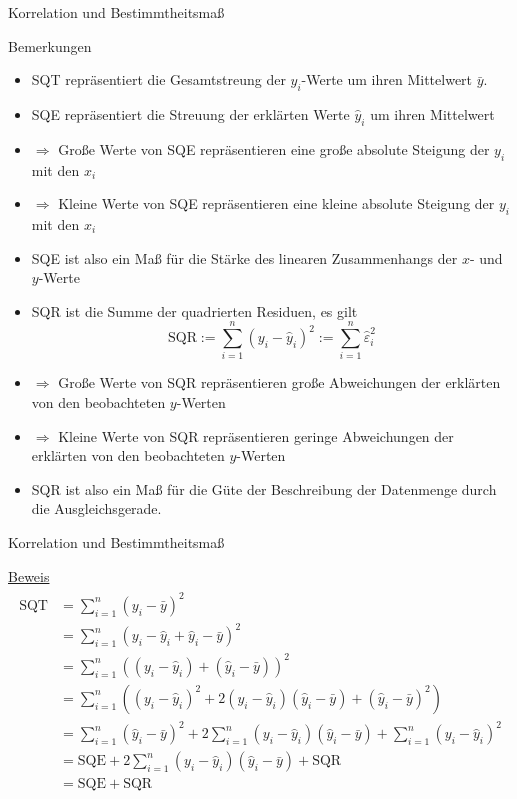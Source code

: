 \documentclass[
  8pt,
  ignorenonframetext,
]{beamer}
\begin{document}
\begin{frame}{Korrelation und Bestimmtheitsmaß}
\protect\hypertarget{korrelation-und-bestimmtheitsmauxdf-4}{}
\footnotesize
{}

Bemerkungen

\begin{itemize}
\item SQT repräsentiert die Gesamtstreung der $y_i$-Werte um ihren Mittelwert $\bar{y}$.
\item SQE repräsentiert die Streuung der erklärten Werte $\hat{y}_i$ um ihren Mittelwert
\item[] $\Rightarrow$ Große Werte von SQE repräsentieren eine große absolute Steigung der $y_i$ mit den $x_i$
\item[] $\Rightarrow$ Kleine Werte von SQE repräsentieren eine kleine absolute Steigung der $y_i$ mit den $x_i$
\item SQE ist also ein Maß für die Stärke des linearen Zusammenhangs der $x$- und $y$-Werte
\item SQR ist die Summe der quadrierten Residuen, es gilt
\begin{equation}
\mbox{SQR} := \sum_{i = 1}^n (y_i - \hat{y}_i)^2 := \sum_{i=1}^n \hat{\varepsilon}_i^2
\end{equation}
\item[] $\Rightarrow$ Große Werte von SQR repräsentieren große Abweichungen der erklärten von den beobachteten $y$-Werten
\item[] $\Rightarrow$ Kleine Werte von SQR repräsentieren geringe Abweichungen der erklärten von den beobachteten $y$-Werten
\item SQR ist also ein Maß für die Güte der Beschreibung der Datenmenge durch die Ausgleichsgerade.
\end{itemize}
\end{frame}

\begin{frame}{Korrelation und Bestimmtheitsmaß}
\protect\hypertarget{korrelation-und-bestimmtheitsmauxdf-5}{}
\vspace{2mm}
\footnotesize
{}

\underline{Beweis} \begin{align}
\begin{split}
\mbox{SQT}
& = \sum_{i=1}^n (y_i - \bar{y})^2 \\
& = \sum_{i=1}^n (y_i - \hat{y}_i  + \hat{y}_i - \bar{y})^2 \\
& = \sum_{i=1}^n ((y_i - \hat{y}_i)  + (\hat{y}_i - \bar{y}))^2 \\
& = \sum_{i=1}^n \left((y_i - \hat{y}_i)^2  + 2(y_i - \hat{y}_i)(\hat{y}_i - \bar{y}) + (\hat{y}_i - \bar{y})^2\right) \\
& = \sum_{i=1}^n(\hat{y}_i - \bar{y})^2  + 2\sum_{i=1}^n(y_i - \hat{y}_i)(\hat{y}_i - \bar{y})  + \sum_{i=1}^n (y_i - \hat{y}_i)^2\\
& = \mbox{SQE}  + 2\sum_{i=1}^n(y_i - \hat{y}_i)(\hat{y}_i - \bar{y})  + \mbox{SQR} \\
& = \mbox{SQE} + \mbox{SQR}
\end{split}
\end{align}
\end{frame}
\end{document}

